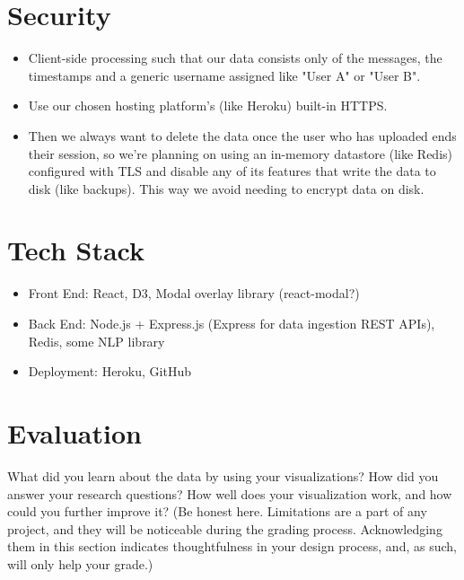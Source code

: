 \documentclass{article}\usepackage{graphicx}
\begin{document}
\section*{Security}
\begin{itemize}
    \item Client-side processing such that our data consists only of the messages, the timestamps and a generic username assigned like "User A" or "User B".
    \item Use our chosen hosting platform's (like Heroku) built-in HTTPS.
    \item Then we always want to delete the data once the user who has uploaded ends their session, so we're planning on using an in-memory datastore (like Redis) configured with TLS and disable any of its features that write the data to disk (like backups). This way we avoid needing to encrypt data on disk.
\end{itemize}

\section*{Tech Stack}
\begin{itemize}
    \item Front End: React, D3, Modal overlay library (react-modal?)
    \item Back End: Node.js + Express.js (Express for data ingestion REST APIs), Redis, some NLP library
    \item Deployment: Heroku, GitHub
\end{itemize}

\section*{Evaluation}
What did you learn about the data by using your visualizations? How did you answer your research questions? How well does your visualization work, and how could you further improve it? (Be honest here. Limitations are a part of any project, and they will be noticeable during the grading process. Acknowledging them in this section indicates thoughtfulness in your design process, and, as such, will only help your grade.)
\end{document}
